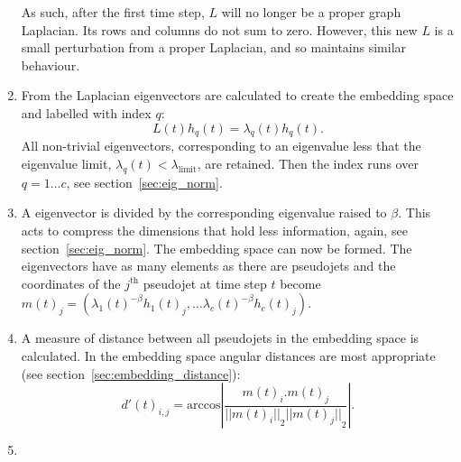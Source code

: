 \begin{enumerate}
        As such, after the first time step, \(L\) will no longer be a proper graph Laplacian.
        Its rows and columns do not sum to zero.
        However, this new \(L\) is a small perturbation from a proper Laplacian,
        and so maintains similar behaviour.

    \item \label{step:eigenvectors} From the Laplacian eigenvectors are calculated to create the embedding space and labelled with index \(q\):
            \begin{equation}
                L(t)h_q(t) = \lambda_q(t) h_q(t).
            \end{equation}
            All non-trivial eigenvectors, corresponding
            to an eigenvalue less that the eigenvalue limit, \(\lambda_q(t) < \lambda_\text{limit}\),
            are retained.
            Then the index runs over \(q = 1 \dots c\),
            see section~\ref{sec:eig_norm}.

        \item \label{step:compression} A eigenvector is divided by the corresponding eigenvalue raised to \(\beta\).
            This acts to compress the dimensions that hold less information, again, see section~\ref{sec:eig_norm}.
            The embedding space can now be formed.
            The eigenvectors have as many elements as there are pseudojets and the coordinates of
            the \(j^\text{th}\) pseudojet at time step \(t\)
            become \(m(t)_j = \left(\lambda_1(t)^{-\beta} h_1(t)_j, \dots \lambda_c(t)^{-\beta} h_c(t)_j\right)\).

        \item  A measure of distance between all pseudojets in the embedding space is calculated.
            In the embedding space angular distances are most appropriate (see section~\ref{sec:embedding_distance}):
            \begin{equation}
                d'(t)_{i, j} = \text{arccos}\left|\frac{m(t)_i.m(t)_j}{{||m(t)_i||}_2 {||m(t)_j||}_2}\right|.
            \end{equation}

        \item\label{step:stoppingcondition}


\end{enumerate}
